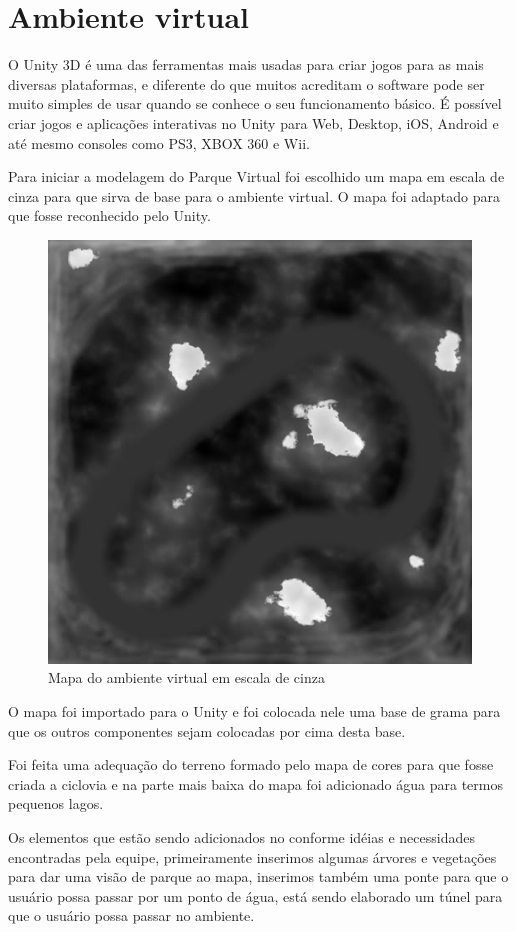 \section{Ambiente virtual}

O Unity 3D é uma das ferramentas mais usadas para criar jogos para as mais diversas 
plataformas, e diferente do que muitos acreditam o software pode ser muito simples 
de usar quando se conhece o seu funcionamento básico. É possível criar jogos e 
aplicações interativas no Unity para Web, Desktop, iOS, Android e até mesmo 
consoles como PS3, XBOX 360 e Wii.

Para iniciar a modelagem do Parque Virtual foi escolhido um mapa em escala de 
cinza para que sirva de base para o ambiente virtual. O mapa foi adaptado para 
que fosse reconhecido pelo Unity.

\begin{figure}[htpb]
 \begin{center}
    \includegraphics[width=.40\textwidth]{figuras/mapa.jpg}
 \end{center}
  \caption{Mapa do ambiente virtual em escala de cinza}
  \label{fig:core_concurrent}
\end{figure}

O mapa foi importado para o Unity e foi colocada nele uma base de grama para que
os outros componentes sejam colocadas por cima desta base.

Foi feita uma adequação do terreno formado pelo mapa de cores para que fosse criada
a ciclovia e na parte mais baixa do mapa foi adicionado água para termos pequenos 
lagos.

Os elementos que estão sendo adicionados no conforme idéias e necessidades encontradas
pela equipe, primeiramente inserimos algumas árvores e vegetações para dar uma visão
de parque ao mapa, inserimos também uma ponte para que o usuário possa passar por um 
ponto de água, está sendo elaborado um túnel para que o usuário possa passar no 
ambiente.  


